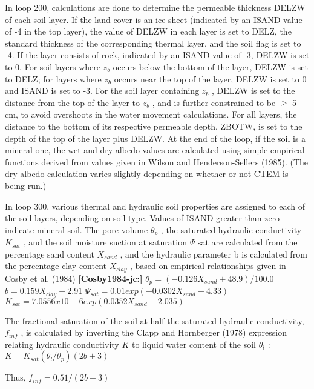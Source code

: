 In loop 200, calculations are done to determine the permeable thickness D\+E\+L\+Z\+W of each soil layer. If the land cover is an ice sheet (indicated by an I\+S\+A\+N\+D value of -\/4 in the top layer), the value of D\+E\+L\+Z\+W in each layer is set to D\+E\+L\+Z, the standard thickness of the corresponding thermal layer, and the soil flag is set to -\/4. If the layer consists of rock, indicated by an I\+S\+A\+N\+D value of -\/3, D\+E\+L\+Z\+W is set to 0. For soil layers where $z_b$ occurs below the bottom of the layer, D\+E\+L\+Z\+W is set to D\+E\+L\+Z; for layers where $z_b$ occurs near the top of the layer, D\+E\+L\+Z\+W is set to 0 and I\+S\+A\+N\+D is set to -\/3. For the soil layer containing $z_b$ , D\+E\+L\+Z\+W is set to the distance from the top of the layer to $z_b$ , and is further constrained to be $\geq$ 5 cm, to avoid overshoots in the water movement calculations. For all layers, the distance to the bottom of its respective permeable depth, Z\+B\+O\+T\+W, is set to the depth of the top of the layer plus D\+E\+L\+Z\+W. At the end of the loop, if the soil is a mineral one, the wet and dry albedo values are calculated using simple empirical functions derived from values given in Wilson and Henderson-\/\+Sellers (1985). (The dry albedo calculation varies slightly depending on whether or not C\+T\+E\+M is being run.)

In loop 300, various thermal and hydraulic soil properties are assigned to each of the soil layers, depending on soil type. Values of I\+S\+A\+N\+D greater than zero indicate mineral soil. The pore volume $\theta_p$ , the saturated hydraulic conductivity $K_{sat}$ , and the soil moisture suction at saturation $\Psi$ sat are calculated from the percentage sand content $X_{sand}$ , and the hydraulic parameter b is calculated from the percentage clay content $X_{clay}$ , based on empirical relationships given in Cosby et al. (1984) {\bfseries [Cosby1984-\/jc\+:]} $\theta_p = (-0.126 X_{sand} +48.9)/100.0$ $b = 0.159 X_{clay} + 2.91$ $\Psi_{sat} = 0.01 exp(-0.0302 X_{sand} + 4.33)$ $K_{sat} = 7.0556 x 10 -6 exp(0.0352 X_{sand} - 2.035)$

The fractional saturation of the soil at half the saturated hydraulic conductivity, $f_{inf}$ , is calculated by inverting the Clapp and Hornberger (1978) \cite{Clapp1978-898} expression relating hydraulic conductivity $K$ to liquid water content of the soil $\theta_l$ \+: $K = K_{sat} (\theta_l / \theta_p ) (2b + 3)$

Thus, $f_{inf} = 0.5 1/(2b+3)$

